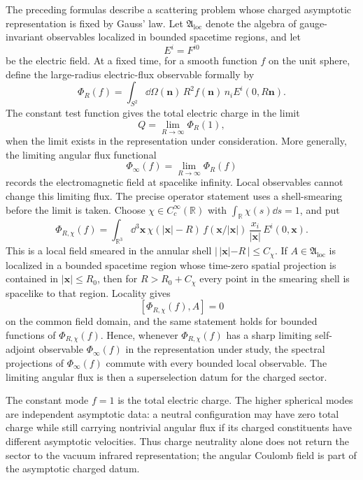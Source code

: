 The preceding formulas describe a scattering problem whose charged asymptotic
representation is fixed by Gauss' law.  Let \(\mathfrak A_{\mathrm{loc}}\) denote
the algebra of gauge-invariant observables localized in bounded spacetime
regions, and let
\[
  E^i=F^{i0}
\]
be the electric field.  At a fixed time, for a smooth function \(f\) on the
unit sphere, define the large-radius electric-flux observable formally by
\[
  \Phi_R(f)
  =
  \int_{S^2}\dd\Omega(\mathbf n)\,
  R^2 f(\mathbf n)\,n_i E^i(0,R\mathbf n).
\]
The constant test function gives the total electric charge in the limit
\[
  Q=\lim_{R\to\infty}\Phi_R(1),
\]
when the limit exists in the representation under consideration.  More
generally, the limiting angular flux functional
\[
  \Phi_\infty(f)=\lim_{R\to\infty}\Phi_R(f)
\]
records the electromagnetic field at spacelike infinity.  Local observables
cannot change this limiting flux.  The precise operator statement uses a
shell-smearing before the limit is taken.  Choose
\(\chi\in C_c^\infty(\mathbb R)\) with \(\int_{\mathbb R}\chi(s)\dd s=1\),
and put
\[
  \Phi_{R,\chi}(f)
  =
  \int_{\mathbb R^3}\dd^3\mathbf x\,
  \chi(|\mathbf x|-R)\,
  f(\mathbf x/|\mathbf x|)\,
  \frac{x_i}{|\mathbf x|}\,E^i(0,\mathbf x).
\]
This is a local field smeared in the annular shell
\(|\,|\mathbf x|-R\,|\le C_\chi\).  If
\(A\in\mathfrak A_{\mathrm{loc}}\) is localized in a bounded spacetime region
whose time-zero spatial projection is contained in \(|\mathbf x|\le R_0\),
then for \(R>R_0+C_\chi\) every point in the smearing shell is spacelike to
that region.  Locality gives
\[
  [\Phi_{R,\chi}(f),A]=0
\]
on the common field domain, and the same statement holds for bounded
functions of \(\Phi_{R,\chi}(f)\).  Hence, whenever
\(\Phi_{R,\chi}(f)\) has a sharp limiting self-adjoint observable
\(\Phi_\infty(f)\) in the representation under study, the spectral
projections of \(\Phi_\infty(f)\) commute with every bounded local
observable.  The limiting angular flux is then a superselection datum for the
charged sector.

The constant mode \(f=1\) is the total electric charge.  The higher spherical
modes are independent asymptotic data: a neutral configuration may have zero
total charge while still carrying nontrivial angular flux if its charged
constituents have different asymptotic velocities.  Thus charge neutrality
alone does not return the sector to the vacuum infrared representation; the
angular Coulomb field is part of the asymptotic charged datum.

